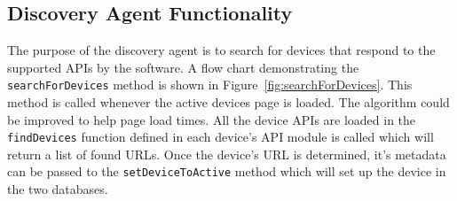 \subsection{Discovery Agent Functionality}
The purpose of the discovery agent is to search for devices that respond to the supported APIs by the software. A flow chart demonstrating the \texttt{searchForDevices} method is shown in Figure~\ref{fig:searchForDevices}. This method is called whenever the active devices page is loaded. The algorithm could be improved to help page load times. All the device APIs are loaded in the \texttt{findDevices} function defined in each device's API module is called which will return a list of found URLs. Once the device's URL is determined, it's metadata can be passed to the \texttt{setDeviceToActive} method which will set up the device in the two databases.

